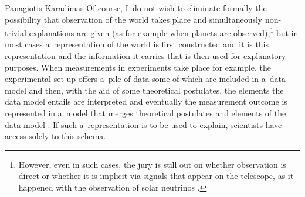 \begin{artengenv}{Panagiotis Karadimas}
Of course, I~do not wish to eliminate formally the possibility that observation of the world takes place and simultaneously non-trivial explanations are given (as for example when planets are observed),\footnote{However, even in such cases, the jury is still out on whether observation is direct or whether it is implicit via signals that appear on the telescope, as it happened with the observation of solar neutrinos
\parencite[][]{shapere_concept_1982}. %
 } but in most cases a~representation of the world is first constructed and it is this representation and the information it carries that is then used for explanatory purposes. When measurements in experiments take place for example, the experimental set up offers a~pile of data some of which are included in a~data-model 
\parencite[][]{peschard_models_2018} %
 and then, with the aid of some theoretical postulates, the elements the data model entails are interpreted and eventually the measurement outcome is represented in a~model that merges theoretical postulates and elements of the data model 
\parencite[][]{parker_computer_2017}. %
 If such a~representation is to be used to explain, scientists have access solely to this schema.


\end{artengenv}
